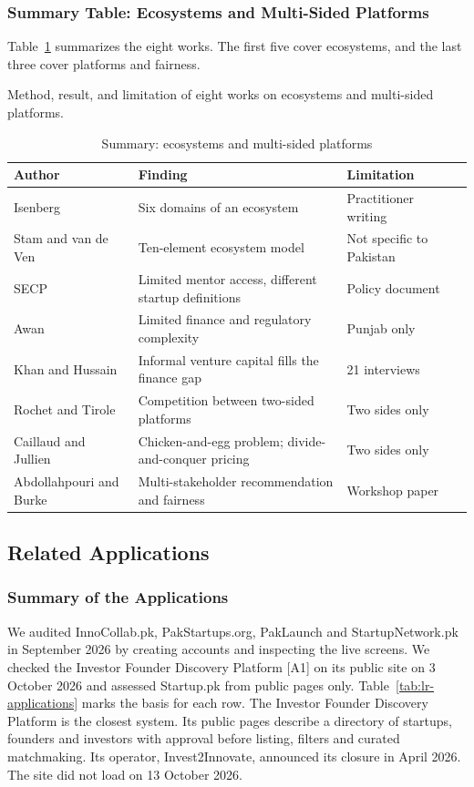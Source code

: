 \documentclass{FastFyp}
\makeatletter
\newcommand{\src}[1]{[#1]}
\newcommand{\capdesc}[1]{%
  \par\nobreak
  \begingroup
  \setstretch{1}%
  \ifdefstring{\@captype}{figure}%
    {\vspace{0.2\baselineskip}}%
    {\vspace{-0.8\baselineskip}}%
  {\centering\normalfont\itshape\small
   \begin{minipage}{0.92\textwidth}\centering #1\end{minipage}\par}%
  \endgroup
  \vspace{0.4\baselineskip}%
}
\makeatother
\begin{document}
\subsubsection{Summary Table: Ecosystems and Multi-Sided Platforms}
Table~\ref{tab:lr-ecosystem} summarizes the eight works. The first five cover ecosystems, and the last three cover platforms and fairness.
\begin{table}[!ht]
\centering
\caption{Summary: ecosystems and multi-sided platforms}
\capdesc{Method, result, and limitation of eight works on ecosystems and multi-sided platforms.}
\begin{tabular}{|p{3.0cm}|p{4.0cm}|p{2.8cm}|p{4.0cm}|}
\hline
\textbf{Author} & \textbf{Finding} & \textbf{Limitation} \\
\hline
Isenberg \cite{ref:isenberg2010} & Six domains of an ecosystem & Practitioner writing \\
\hline
Stam and van de Ven \cite{ref:stam2021} & Ten-element ecosystem model & Not specific to Pakistan \\
\hline
SECP \cite{ref:secpposition} & Limited mentor access, different startup definitions & Policy document \\
\hline
Awan \cite{ref:awan2025} & Limited finance and regulatory complexity & Punjab only \\
\hline
Khan and Hussain \cite{ref:khan2026informal} & Informal venture capital fills the finance gap & 21 interviews \\
\hline
Rochet and Tirole \cite{ref:rochet2003} & Competition between two-sided platforms & Two sides only \\
\hline
Caillaud and Jullien \cite{ref:caillaud2003} & Chicken-and-egg problem; divide-and-conquer pricing & Two sides only \\
\hline
Abdollahpouri and Burke \cite{ref:abdollahpouri2019} & Multi-stakeholder recommendation and fairness & Workshop paper \\
\hline
\end{tabular}
\label{tab:lr-ecosystem}
\end{table}

\subsection{Related Applications}

\subsubsection{Summary of the Applications}
We audited InnoCollab.pk, PakStartups.org, PakLaunch and StartupNetwork.pk in September 2026 by creating accounts and inspecting the live screens. We checked the Investor Founder Discovery Platform \src{A1} on its public site on 3 October 2026 and assessed Startup.pk from public pages only. Table~\ref{tab:lr-applications} marks the basis for each row. The Investor Founder Discovery Platform is the closest system. Its public pages describe a directory of startups, founders and investors with approval before listing, filters and curated matchmaking. Its operator, Invest2Innovate, announced its closure in April 2026. The site did not load on 13 October 2026.
\end{document}
